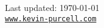 \documentclass[letterpaper]{article}
\renewenvironment{itemize}{
  \begin{list}{}{
    \setlength{\leftmargin}{1em}
  }
}{
  \end{list}
}
\begin{document}
% 
%         
% 


\bigskip

\begin{center}
\begin{footnotesize}
Last updated: \today \\
\href{http://kevin-purcell.com/}{\tt www.kevin-purcell.com}
\end{footnotesize}
\end{center}
\end{document}
